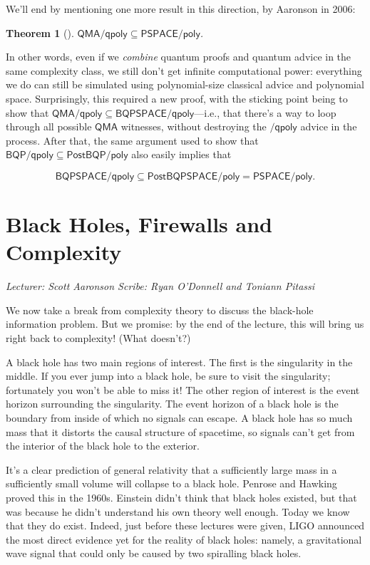 \documentclass[12pt]{report}
\theoremstyle{plain}
\newtheorem{theorem}{Theorem}[section]
\theoremstyle{definition}
\newcommand{\lecture}[3]{%
  \chapter{#3}%
  \vspace{-5ex}%
  \textit{Lecturer: #1 \hfill Scribe: #2}\par%
  \vspace{1ex}\titlerule\vspace{2ex}}
\begin{document}
We'll end by mentioning one more result in this direction, by Aaronson \cite{aar:qmaqpoly} in 2006:

\begin{theorem}[\cite{aar:qmaqpoly}]
\label{qmaqpolythm}
$\mathsf{QMA/qpoly}\subseteq \mathsf{PSPACE/poly}$.
\end{theorem}

In other words, even if we {\em combine} quantum proofs and quantum advice in the same complexity class, we still don't get infinite computational power: everything we do can still be simulated using polynomial-size classical advice and polynomial space.  Surprisingly, this required a new proof, with the sticking point being to show that $\mathsf{QMA/qpoly}\subseteq \mathsf{BQPSPACE/qpoly}$---i.e., that there's a way to loop through all possible $\mathsf{QMA}$ witnesses, without destroying the $\mathsf{/qpoly}$ advice in the process.  After that, the same argument used to show that $\mathsf{BQP/qpoly}\subseteq \mathsf{PostBQP/poly}$ also easily implies that

$$\mathsf{BQPSPACE/qpoly} \subseteq \mathsf{PostBQPSPACE/poly} = \mathsf{PSPACE/poly}.$$

\lecture{Scott Aaronson}{Ryan O'Donnell and Toniann Pitassi}{Black Holes, Firewalls and Complexity}

We now take a break from complexity theory to discuss the black-hole information problem.  But we promise: by the end of the lecture, this will bring us right back to complexity!  (What doesn't?)

A black hole has two main regions of interest.
The first is the singularity in the middle.
If you ever jump into a black hole, be sure to visit the singularity;
fortunately you won't be able to miss it!
The other region of interest is the event horizon surrounding the singularity.
The event horizon of a black hole is the boundary
from inside of which no signals can escape. A black hole has so much mass that it distorts
the causal structure of spacetime, so signals can't get from the interior of the
black hole to the exterior.

It's a clear prediction of general relativity that a
sufficiently large mass in a sufficiently small volume
will collapse to a black hole.  Penrose and Hawking proved this in the 1960s.
Einstein didn't think that black holes existed, but that was because
he didn't understand his own theory well enough.
Today we know that they do exist.
Indeed, just before these lectures were given, LIGO announced
the most direct evidence yet for the reality of black holes: namely, a gravitational wave signal that
could only be caused by two spiralling black holes.
\end{document}
